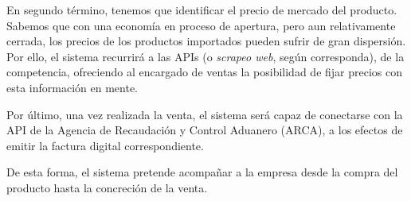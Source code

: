 En segundo término,
tenemos que identificar el precio de mercado del producto.
Sabemos que con una economía en proceso de apertura,
pero aun relativamente cerrada,
los precios de los productos importados pueden sufrir de gran dispersión.
Por ello,
el sistema recurrirá a las APIs (o \textit{scrapeo web}, según corresponda),
de la competencia,
ofreciendo al encargado de ventas la posibilidad de fijar precios con esta información en mente.

Por último,
una vez realizada la venta,
el sistema será capaz de conectarse con la API de la Agencia de Recaudación y Control Aduanero (ARCA),
a los efectos de emitir la factura digital correspondiente.

De esta forma,
el sistema pretende acompañar a la empresa desde la compra del producto hasta la concreción de la venta.